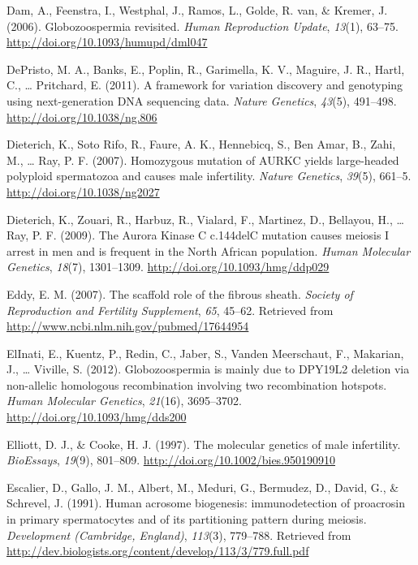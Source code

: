 \documentclass[12pt,twoside]{reedthesis}
\theoremstyle{definition}
\theoremstyle{definition}
\theoremstyle{remark}
\begin{document}
  \hypertarget{ref-Dam2006}{}
  Dam, A., Feenstra, I., Westphal, J., Ramos, L., Golde, R. van, \&
  Kremer, J. (2006). Globozoospermia revisited. \emph{Human Reproduction
  Update}, \emph{13}(1), 63--75.
  \url{http://doi.org/10.1093/humupd/dml047}
  
  \hypertarget{ref-DePristo2011}{}
  DePristo, M. A., Banks, E., Poplin, R., Garimella, K. V., Maguire, J.
  R., Hartl, C., \ldots{} Pritchard, E. (2011). A framework for variation
  discovery and genotyping using next-generation DNA sequencing data.
  \emph{Nature Genetics}, \emph{43}(5), 491--498.
  \url{http://doi.org/10.1038/ng.806}
  
  \hypertarget{ref-Dieterich2007}{}
  Dieterich, K., Soto Rifo, R., Faure, A. K., Hennebicq, S., Ben Amar, B.,
  Zahi, M., \ldots{} Ray, P. F. (2007). Homozygous mutation of AURKC
  yields large-headed polyploid spermatozoa and causes male infertility.
  \emph{Nature Genetics}, \emph{39}(5), 661--5.
  \url{http://doi.org/10.1038/ng2027}
  
  \hypertarget{ref-Dieterich2009}{}
  Dieterich, K., Zouari, R., Harbuz, R., Vialard, F., Martinez, D.,
  Bellayou, H., \ldots{} Ray, P. F. (2009). The Aurora Kinase C c.144delC
  mutation causes meiosis I arrest in men and is frequent in the North
  African population. \emph{Human Molecular Genetics}, \emph{18}(7),
  1301--1309. \url{http://doi.org/10.1093/hmg/ddp029}
  
  \hypertarget{ref-Eddy2007}{}
  Eddy, E. M. (2007). The scaffold role of the fibrous sheath.
  \emph{Society of Reproduction and Fertility Supplement}, \emph{65},
  45--62. Retrieved from \url{http://www.ncbi.nlm.nih.gov/pubmed/17644954}
  
  \hypertarget{ref-ElInati2012}{}
  ElInati, E., Kuentz, P., Redin, C., Jaber, S., Vanden Meerschaut, F.,
  Makarian, J., \ldots{} Viville, S. (2012). Globozoospermia is mainly due
  to DPY19L2 deletion via non-allelic homologous recombination involving
  two recombination hotspots. \emph{Human Molecular Genetics},
  \emph{21}(16), 3695--3702. \url{http://doi.org/10.1093/hmg/dds200}
  
  \hypertarget{ref-Elliott1997}{}
  Elliott, D. J., \& Cooke, H. J. (1997). The molecular genetics of male
  infertility. \emph{BioEssays}, \emph{19}(9), 801--809.
  \url{http://doi.org/10.1002/bies.950190910}
  
  \hypertarget{ref-Escalier1991}{}
  Escalier, D., Gallo, J. M., Albert, M., Meduri, G., Bermudez, D., David,
  G., \& Schrevel, J. (1991). Human acrosome biogenesis: immunodetection
  of proacrosin in primary spermatocytes and of its partitioning pattern
  during meiosis. \emph{Development (Cambridge, England)}, \emph{113}(3),
  779--788. Retrieved from
  \url{http://dev.biologists.org/content/develop/113/3/779.full.pdf}
  
\end{document}
